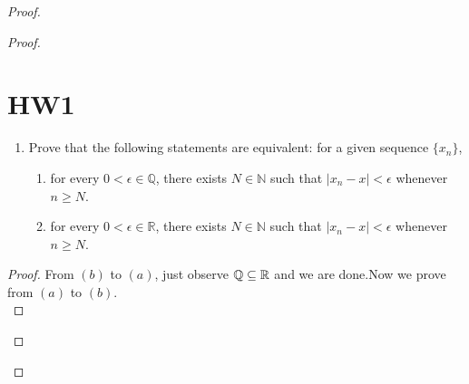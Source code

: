 \documentclass{report}
\begin{document}
\begin{proof}
\begin{proof}
\section{HW1}
\begin{question}{}{}
\begin{enumerate}
    \item Prove that the following statements are equivalent: for a given sequence $\{x_n\}$,
    \begin{enumerate}
        \item for every $0 < \epsilon \in \mathbb{Q}$, there exists $N \in \mathbb{N}$ such that $|x_n - x| < \epsilon$ whenever $n \geq N$.
        \item for every $0 < \epsilon \in \mathbb{R}$, there exists $N \in \mathbb{N}$ such that $|x_n - x| < \epsilon$ whenever $n \geq N$.
    \end{enumerate}
\end{enumerate}
\end{question}
\begin{proof}
From $(b)$ to $(a)$, just observe  $\mathbb{Q} \subseteq \mathbb{R}$ and we are done.Now we prove from $(a)$ to $(b)$.\\


\end{proof}
\end{proof}
\end{proof}
\end{document}
